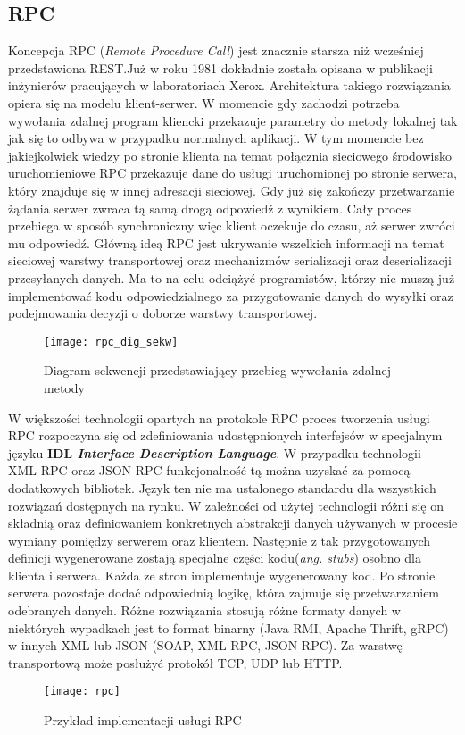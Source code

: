\subsection{RPC}
Koncepcja RPC (\textit{Remote Procedure Call}) jest znacznie starsza niż wcześniej przedstawiona REST.\@ Już w roku 1981 dokładnie została opisana w publikacji inżynierów pracujących w laboratoriach Xerox\cite{nelson1981remote}. Architektura takiego rozwiązania opiera się na modelu klient-serwer. W momencie gdy zachodzi potrzeba wywołania zdalnej program kliencki przekazuje parametry do metody lokalnej tak jak się to odbywa w przypadku normalnych aplikacji. W tym momencie bez jakiejkolwiek wiedzy po stronie klienta na temat połącznia sieciowego środowisko uruchomieniowe RPC przekazuje dane do usługi uruchomionej po stronie serwera, który znajduje się w innej adresacji sieciowej. Gdy już się zakończy przetwarzanie żądania serwer zwraca tą samą drogą odpowiedź z wynikiem. Cały proces przebiega w sposób synchroniczny więc klient oczekuje do czasu, aż serwer zwróci mu odpowiedź. Główną ideą RPC jest ukrywanie wszelkich informacji na temat sieciowej warstwy transportowej oraz mechanizmów serializacji oraz deserializacji przesyłanych danych. Ma to na celu odciążyć programistów, którzy nie muszą już implementować kodu odpowiedzialnego za przygotowanie danych do wysyłki oraz podejmowania decyzji o doborze warstwy transportowej.
\begin{figure}[h!]
    \caption{Diagram sekwencji przedstawiający przebieg wywołania zdalnej metody}
    \texttt{[image: rpc\_dig\_sekw]}
    \centering
\end{figure} 
\par W większości technologii opartych na protokole RPC proces tworzenia usługi RPC rozpoczyna się od zdefiniowania udostępnionych interfejsów w specjalnym języku \textbf{IDL \textit{Interface Description Language}}. W przypadku technologii XML-RPC oraz JSON-RPC funkcjonalność tą można uzyskać za pomocą dodatkowych bibliotek. Język ten nie ma ustalonego standardu dla wszystkich rozwiązań dostępnych na rynku. W zależności od użytej technologii różni się on składnią oraz definiowaniem konkretnych abstrakcji danych używanych w procesie wymiany pomiędzy serwerem oraz klientem. Następnie z tak przygotowanych definicji wygenerowane zostają specjalne części kodu(\textit{ang. stubs}) osobno dla klienta i serwera. Każda ze stron implementuje wygenerowany kod. Po stronie serwera pozostaje dodać odpowiednią logikę, która zajmuje się przetwarzaniem odebranych danych. Różne rozwiązania stosują różne formaty danych w niektórych wypadkach jest to format binarny (Java RMI, Apache Thrift, gRPC) w innych XML lub JSON (SOAP, XML-RPC, JSON-RPC). Za warstwę transportową może posłużyć protokół TCP, UDP lub HTTP.
\begin{figure}[h!]
    \caption{Przykład implementacji usługi RPC}
    \texttt{[image: rpc]}
    \centering
\end{figure}
